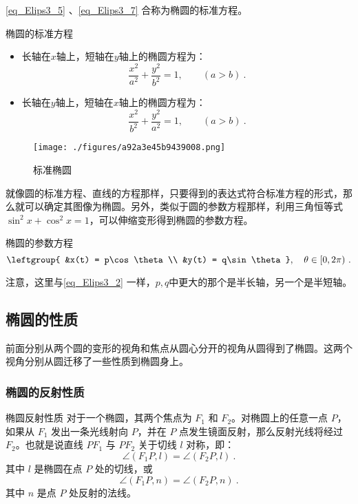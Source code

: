 \autoref{eq_Elips3_5} 、\autoref{eq_Elips3_7} 合称为椭圆的标准方程。
\begin{theorem}{椭圆的标准方程}
\begin{itemize}
\item 长轴在$x$轴上，短轴在$y$轴上的椭圆方程为：
\begin{equation}\label{eq_Elips3_3}
\frac{x^2}{a^2} + \frac{y^2}{b^2} = 1,\qquad(a>b)~.
\end{equation}
\item 长轴在$y$轴上，短轴在$x$轴上的椭圆方程为：
\begin{equation}
\frac{x^2}{b^2} + \frac{y^2}{a^2} = 1,\qquad(a>b)~.
\end{equation}
\end{itemize}
\end{theorem}
\begin{figure}[ht]
\centering
\texttt{[image: ./figures/a92a3e45b9439008.png]}
\caption{标准椭圆} \label{fig_Elips3_2}
\end{figure}

就像圆的标准方程、直线的方程那样，只要得到的表达式符合标准方程的形式，那么就可以确定其图像为椭圆。另外，类似于圆的参数方程那样，利用三角恒等式$\sin^2x+\cos^2x=1$，可以伸缩变形得到椭圆的参数方程。
\begin{theorem}{椭圆的参数方程}
\begin{equation}\label{eq_Elips3_1}
\leftgroup{
&x(t) = p\cos \theta\\
&y(t) = q\sin \theta
},\quad \theta \in [0, 2\pi) ~.
\end{equation}
\end{theorem}
注意，这里与\autoref{eq_Elips3_2} 一样，$p,q$中更大的那个是半长轴，另一个是半短轴。

\subsection{椭圆的性质}

前面分别从两个圆的变形的视角和焦点从圆心分开的视角从圆得到了椭圆。这两个视角分别从圆迁移了一些性质到椭圆身上。

\subsubsection{椭圆的反射性质}

\begin{theorem}{椭圆反射性质}
对于一个椭圆，其两个焦点为 $F_1$ 和 $F_2$。对椭圆上的任意一点 $P$，如果从 $F_1$ 发出一条光线射向 $P$，并在 $P$ 点发生镜面反射，那么反射光线将经过 $F_2$。也就是说直线 $PF_1$ 与 $PF_2$ 关于切线 $l$ 对称，即：
\begin{equation}
\angle (F_1P, l) = \angle (F_2P, l)~.
\end{equation}
其中 $l$ 是椭圆在点 $P$ 处的切线，或
\begin{equation}
\angle (F_1P, n) = \angle (F_2P, n)~.
\end{equation}
其中 $n$ 是点 $P$ 处反射的法线。
\end{theorem}

